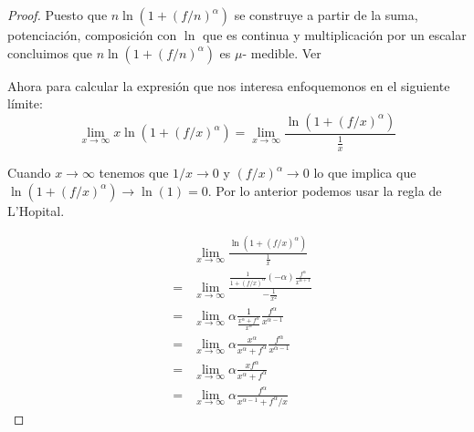 \documentclass[letter,twoside,12pt]{article}
\numberwithin{equation}{section}
\begin{document}
\begin{enumerate}[label = (\textbf{\arabic*.})]
\begin{proof}
Puesto que $n \ln (1 + (f/n)^\alpha) $ se construye a partir de la suma, potenciación, composición con $ \ln $ que es continua y multiplicación por un escalar concluimos que $n \ln (1 + (f/n)^\alpha) $ es $ \mu $- medible. Ver \cite[Teoremas 11.7 y 11.8]{hewitt}

%

Ahora para calcular la expresión que nos interesa enfoquemonos en el siguiente límite:
\begin{equation}
\lim_{x \to \infty} x\ln(1+(f/x)^\alpha) 
= \lim_{x \to \infty} \frac{\ln(1+(f/x)^\alpha)}{\frac{1}{x}} \nonumber
\end{equation}

Cuando $ x \to \infty $ tenemos que $ 1/x \to 0 $ y $ (f/x)^\alpha \to 0 $ lo que implica que $ \ln(1+(f/x)^\alpha) \to \ln(1) = 0 $. Por lo anterior podemos usar la regla de L'Hopital.

\begin{eqnarray}
& & \lim_{x \to \infty} \frac{\ln(1+(f/x)^\alpha)}{\frac{1}{x}} \nonumber
\\ &=& \lim_{x \to \infty} \frac{\frac{1}{1+(f/x)^\alpha}(-\alpha)\frac{f^\alpha}{x^{\alpha+1}}}{-\frac{1}{x^2}} \nonumber
\\ &=& \lim_{x \to \infty} \alpha\frac{1}{\frac{x^{\alpha}+f^\alpha}{x^\alpha}}\frac{f^\alpha}{x^{\alpha-1}} \nonumber
\\ &=& \lim_{x \to \infty} \alpha\frac{x^\alpha}{x^{\alpha}+f^\alpha}\frac{f^\alpha}{x^{\alpha-1}} \nonumber
\\ &=& \lim_{x \to \infty} \alpha\frac{xf^\alpha}{x^{\alpha}+f^\alpha} \nonumber
\\ &=& \lim_{x \to \infty} \alpha\frac{f^\alpha}{x^{\alpha-1}+f^\alpha/x} \nonumber
\end{eqnarray}


\end{proof}
\end{enumerate}
\end{document}
